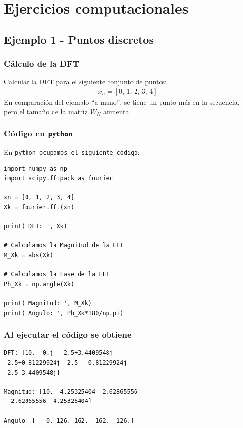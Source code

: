 \documentclass[12pt]{beamer}
\begin{document}
\section{Ejercicios computacionales}
\subsection{Ejemplo 1 - Puntos discretos}

\begin{frame}
\frametitle{Cálculo de la DFT}
Calcular la DFT para el siguiente conjunto de puntos:
\begin{align*}
x_{n} = [0, \, 1, \, 2, \, 3, \, 4] 
\end{align*}
En comparación del ejemplo \enquote{a mano}, se tiene un punto más en la secuencia, pero el tamaño de la matriz $W_{N}$ aumenta.
\end{frame}
\begin{frame}
\frametitle{Código en \texttt{python}}
En \texttt{python ocupamos el siguiente código}:
\begin{lstlisting}
import numpy as np
import scipy.fftpack as fourier

xn = [0, 1, 2, 3, 4] 
Xk = fourier.fft(xn) 

print('DFT: ', Xk)

# Calculamos la Magnitud de la FFT
M_Xk = abs(Xk)   

# Calculamos la Fase de la FFT
Ph_Xk = np.angle(Xk)

print('Magnitud: ', M_Xk)
print('Angulo: ', Ph_Xk*180/np.pi)
\end{lstlisting}
\end{frame}
\begin{frame}[fragile]
\frametitle{Al ejecutar el código se obtiene}
\pause
\begin{verbatim}
DFT: [10. -0.j  -2.5+3.4409548j  
-2.5+0.81229924j -2.5  -0.81229924j
-2.5-3.4409548j]

Magnitud: [10.  4.25325404  2.62865556
  2.62865556  4.25325404]

Angulo: [  -0. 126. 162. -162. -126.]
\end{verbatim}
\end{frame}
\end{document}
